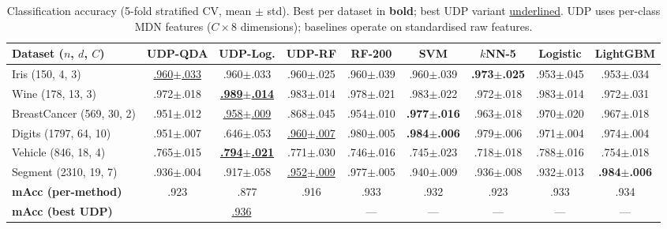 \documentclass[journal]{IEEEtran}
\begin{document}
\begin{table}[t]
\centering
\caption{Classification accuracy (5-fold stratified CV, mean $\pm$ std).  Best per dataset in \textbf{bold}; best UDP variant \underline{underlined}.  UDP uses per-class MDN features ($C{\times}8$ dimensions); baselines operate on standardised raw features.}
\label{tab:classification}
\begin{tabular}{@{}l ccc ccccc@{}}
\toprule
\textbf{Dataset} ($n$, $d$, $C$)
  & \textbf{UDP-QDA} & \textbf{UDP-Log.} & \textbf{UDP-RF}
  & \textbf{RF-200} & \textbf{SVM} & \textbf{$k$NN-5}
  & \textbf{Logistic} & \textbf{LightGBM} \\
\midrule
Iris (150, 4, 3)
  & \underline{.960{\scriptsize$\pm$.033}} & .960{\scriptsize$\pm$.033} & .960{\scriptsize$\pm$.025}
  & .960{\scriptsize$\pm$.039} & .960{\scriptsize$\pm$.039} & \textbf{.973{\scriptsize$\pm$.025}}
  & .953{\scriptsize$\pm$.045} & .953{\scriptsize$\pm$.034} \\
Wine (178, 13, 3)
  & .972{\scriptsize$\pm$.018} & \underline{\textbf{.989{\scriptsize$\pm$.014}}} & .983{\scriptsize$\pm$.014}
  & .978{\scriptsize$\pm$.021} & .983{\scriptsize$\pm$.022} & .972{\scriptsize$\pm$.018}
  & .983{\scriptsize$\pm$.014} & .972{\scriptsize$\pm$.031} \\
BreastCancer (569, 30, 2)
  & .951{\scriptsize$\pm$.012} & \underline{.958{\scriptsize$\pm$.009}} & .868{\scriptsize$\pm$.045}
  & .954{\scriptsize$\pm$.010} & \textbf{.977{\scriptsize$\pm$.016}} & .963{\scriptsize$\pm$.018}
  & .970{\scriptsize$\pm$.020} & .967{\scriptsize$\pm$.018} \\
Digits (1797, 64, 10)
  & .951{\scriptsize$\pm$.007} & .646{\scriptsize$\pm$.053} & \underline{.960{\scriptsize$\pm$.007}}
  & .980{\scriptsize$\pm$.005} & \textbf{.984{\scriptsize$\pm$.006}} & .979{\scriptsize$\pm$.006}
  & .971{\scriptsize$\pm$.004} & .974{\scriptsize$\pm$.004} \\
Vehicle (846, 18, 4)
  & .765{\scriptsize$\pm$.015} & \underline{\textbf{.794{\scriptsize$\pm$.021}}} & .771{\scriptsize$\pm$.030}
  & .746{\scriptsize$\pm$.016} & .745{\scriptsize$\pm$.023} & .718{\scriptsize$\pm$.018}
  & .788{\scriptsize$\pm$.016} & .754{\scriptsize$\pm$.018} \\
Segment (2310, 19, 7)
  & .936{\scriptsize$\pm$.004} & .917{\scriptsize$\pm$.058} & \underline{.952{\scriptsize$\pm$.009}}
  & .977{\scriptsize$\pm$.005} & .940{\scriptsize$\pm$.009} & .936{\scriptsize$\pm$.008}
  & .932{\scriptsize$\pm$.013} & \textbf{.984{\scriptsize$\pm$.006}} \\
\midrule
\textbf{mAcc (per-method)}
  & .923 & .877 & .916
  & .933 & .932 & .923
  & .933 & .934 \\
\textbf{mAcc (best UDP)}
  & \multicolumn{3}{c}{\underline{.936}}
  & --- & --- & ---
  & --- & --- \\
\bottomrule
\end{tabular}
\end{table}
\end{document}
